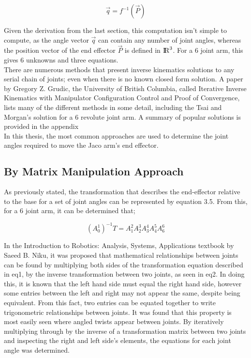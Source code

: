 \documentclass[12pt,openany,a4paper]{book}
\begin{document}
\vspace{\baselineskip}
\begin{equation}
\vec{q} = f^{-1}( \vec{P} )
\end{equation}

\vspace{\baselineskip}
Given the derivation from the last section, this computation isn't simple to compute, as the angle vector $\vec{q}$ can contain any number of joint angles, whereas the position vector of the end effector $\vec{P}$ is defined in ${\rm I\!R}^3$. For a 6 joint arm, this gives 6 unknowns and three equations.\\

There are numerous methods that present inverse kinematics solutions to any serial chain of joints; even when there is no known closed form solution. A paper by Gregory Z. Grudic, the University of British Columbia, called Iterative Inverse Kinematics with Manipulator Configuration Control and Proof of Convergence, lists many of the different methods in some detail, including the Tsai and Morgan's solution for a 6 revolute joint arm. A summary of popular solutions is provided in the appendix\\

In this thesis, the most common approaches are used to determine the joint angles required to move the Jaco arm's end effector. %

\subsection{By Matrix Manipulation Approach}
As previously stated, the transformation that describes the end-effector relative to the base for a set of joint angles can be represented by equation 3.5. From this, for a 6 joint arm, it can be determined that;

\vspace{\baselineskip}
\begin{equation}
(A_{0}^{1})^{-1} T = A_{1}^{2} A_{2}^{3} A_{3}^{4} A_{4}^{5} A_{6}^{6}
\end{equation}

\vspace{\baselineskip}
In the Introduction to Robotics: Analysis, Systems, Applications textbook by Saeed B. Niku, it was proposed that mathematical relationships between joints can be found by multiplying both sides of the transformation equation described in eq1, by the inverse transformation between two joints, as seen in eq2. In doing this, it is known that the left hand side must equal the right hand side, however some entries between the left and right may not appear the same, despite being equivalent. From this fact, two entries can be equated together to write trigonometric relationships between joints. It was found that this property is most easily seen where angled twists appear between joints. By iteratively multiplying through by the inverse of a transformation matrix between two joints and inspecting the right and left side's elements, the equations for each joint angle was determined. 
\end{document}
